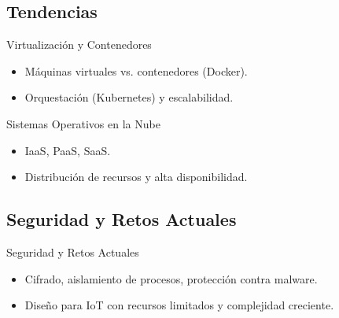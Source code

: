 \documentclass{beamer}
\begin{document}
\subsection{Tendencias}
\begin{frame}{Virtualización y Contenedores}
    \begin{itemize}
        \item Máquinas virtuales vs. contenedores (Docker).
        \item Orquestación (Kubernetes) y escalabilidad.
    \end{itemize}
\end{frame}

\begin{frame}{Sistemas Operativos en la Nube}
    \begin{itemize}
        \item IaaS, PaaS, SaaS.
        \item Distribución de recursos y alta disponibilidad.
    \end{itemize}
\end{frame}

\subsection{Seguridad y Retos Actuales}
\begin{frame}{Seguridad y Retos Actuales}
    \begin{itemize}
        \item Cifrado, aislamiento de procesos, protección contra malware.
        \item Diseño para IoT con recursos limitados y complejidad creciente.
    \end{itemize}
\end{frame}
\end{document}
